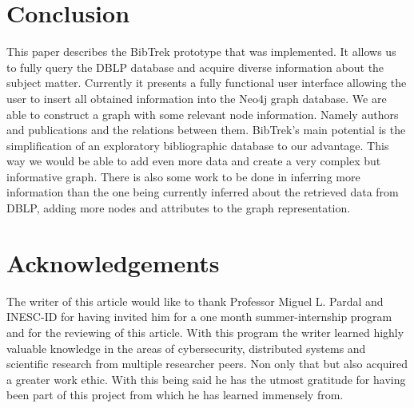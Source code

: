 \documentclass[twocolumn]{article}
\begin{document}
\section{Conclusion}
This paper describes the BibTrek prototype that was implemented. It allows us to fully query the DBLP database and acquire diverse information about the subject matter. Currently it presents a fully functional user interface allowing the user to insert all obtained information into the Neo4j graph database. We are able to construct a graph with some relevant node information. Namely authors and publications and the relations between them. BibTrek's main potential is the simplification of an exploratory bibliographic database to our advantage. This way we would be able to add even more data and create a very complex but informative graph. There is also some work to be done in inferring more information than the one being currently inferred about the retrieved data from DBLP, adding more nodes and attributes to the graph representation.

\section{Acknowledgements}
The writer of this article would like to thank Professor Miguel L. Pardal and INESC-ID for having invited him for a one month summer-internship program and for the reviewing of this article. With this program the writer learned highly valuable knowledge in the areas of cybersecurity, distributed systems and scientific research from multiple researcher peers. Non only that but also acquired a greater work ethic. With this being said he has the utmost gratitude for having been part of this project from which he has learned immensely from. 
\end{document}
